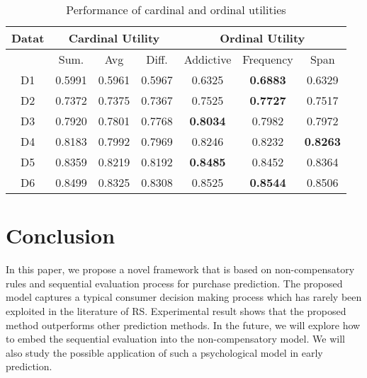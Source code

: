 \documentclass[sigconf]{acmart}
\begin{document}
\begin{table}[htbp]
\caption{Performance of cardinal and ordinal utilities}
\label{tab:utility}
\begin{tabular}{|c|c|c|c|c|c|c|}
\hline
{Datat} & \multicolumn{3}{|c|}{Cardinal Utility} & \multicolumn{3}{|c|}{Ordinal Utility} \\\hline
 &  Sum. & Avg & Diff. & Addictive  & Frequency &Span \\\hline
D1 & 0.5991	&0.5961&	0.5967	&0.6325	&\bf{0.6883}	&0.6329\\\hline
D2 & 0.7372	&0.7375&	0.7367&	0.7525	&\bf{0.7727}	&0.7517\\\hline
D3 & 0.7920&	0.7801	&0.7768	&\bf{0.8034}&	0.7982&0.7972\\\hline
D4 &0.8183&	0.7992	&0.7969	&0.8246&	0.8232	&\bf{0.8263} \\\hline
D5& 0.8359	&0.8219&	0.8192&	\bf{0.8485}&	0.8452&0.8364\\\hline
D6 & 0.8499	&0.8325	&0.8308&	0.8525&	\bf{0.8544}&	0.8506
\\ \hline \end{tabular}
\end{table}


\section{Conclusion}\label{sec:conclusion}
In this paper, we propose a novel framework that is based on non-compensatory rules and sequential evaluation process for purchase prediction. The proposed model captures a typical consumer decision making process which has rarely been exploited in the literature of RS. Experimental result shows that the proposed method outperforms other prediction methods. In the future, we will explore how to embed the sequential evaluation into the non-compensatory model. We will also study the possible application of such a psychological model in early prediction.
\end{document}
